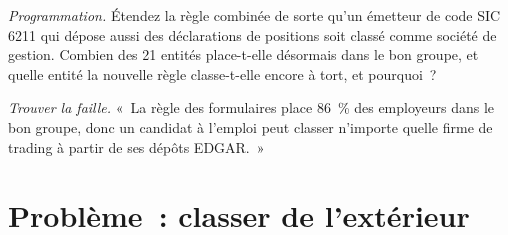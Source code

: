 \begin{exercise}[$\star\star\star$]\label{exo:in:a-map-of-the-industry:7}
\emph{Programmation.} Étendez la règle combinée de sorte qu'un émetteur de code SIC 6211 qui dépose aussi des déclarations de positions soit classé comme
société de gestion. Combien des 21 entités place-t-elle désormais dans le bon groupe, et quelle entité la nouvelle règle
classe-t-elle encore à tort, et pourquoi~?
\end{exercise}

\begin{exercise}[$\star\star\star$]\label{exo:in:a-map-of-the-industry:8}
\emph{Trouver la faille.} «~La règle des formulaires place 86~\% des employeurs dans le bon groupe, donc un candidat à l'emploi
peut classer n'importe quelle firme de trading à partir de ses dépôts EDGAR.~»
\end{exercise}

\section{Problème~: classer de l'extérieur}

